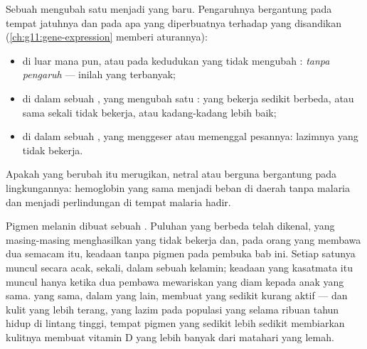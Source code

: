 \begin{proposition}\label{prop:g11:mutations:consequences}
Sebuah  mengubah satu  menjadi  yang baru. Pengaruhnya
bergantung pada tempat jatuhnya dan pada apa yang diperbuatnya terhadap
 yang disandikan  (\cref{ch:g11:gene-expression} memberi
aturannya):
\begin{itemize}
  \item di luar  mana pun, atau pada kedudukan yang tidak mengubah
        : \emph{tanpa pengaruh} --- inilah yang terbanyak;
  \item di dalam sebuah , yang mengubah satu : 
        yang bekerja sedikit berbeda, atau sama sekali tidak bekerja,
        atau kadang-kadang lebih baik;
  \item di dalam sebuah , yang menggeser atau memenggal pesannya:
        lazimnya  yang tidak bekerja.
\end{itemize}
Apakah  yang berubah itu merugikan, netral atau berguna
bergantung pada lingkungannya:   hemoglobin yang sama menjadi
beban di daerah tanpa malaria dan menjadi perlindungan di tempat
malaria hadir.
\end{proposition}
\admitted

\begin{example}\label{ex:g11:mutations:pigment}
Pigmen melanin dibuat sebuah . Puluhan   yang berbeda
telah dikenal, yang masing-masing menghasilkan  yang tidak bekerja
dan, pada orang yang membawa dua  semacam itu, keadaan tanpa pigmen
pada pembuka bab ini. Setiap satunya muncul secara acak, sekali, dalam
sebuah  kelamin; keadaan yang kasatmata itu muncul hanya ketika dua
pembawa mewariskan  yang diam kepada anak yang sama.  yang
sama, dalam  yang lain, membuat  yang sedikit kurang aktif ---
dan kulit yang lebih terang, yang lazim pada populasi yang selama
ribuan tahun hidup di lintang tinggi, tempat pigmen yang sedikit lebih
sedikit membiarkan kulitnya membuat vitamin D yang lebih banyak dari
matahari yang lemah.
\end{example}

